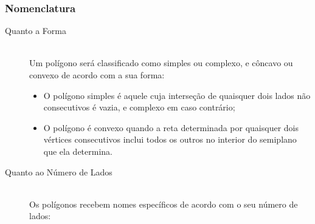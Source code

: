     \subsubsection{Nomenclatura}
        \begin{description}
            \item[Quanto a Forma] \hfill \\
                Um polígono será classificado como simples ou complexo, e côncavo ou convexo de acordo com a sua forma:
                \begin{itemize}
                    \item O polígono simples é aquele cuja interseção de quaisquer dois lados não consecutivos é vazia, e complexo em caso contrário;
                    \item O polígono é convexo quando a reta determinada por quaisquer dois vértices consecutivos inclui todos os outros no interior do semiplano que ela determina.
                \end{itemize} 
            \item[Quanto ao Número de Lados] \hfill \\
                Os polígonos recebem nomes específicos de acordo com o seu número de lados:
                \begin{enumerate}[start=3]
\end{enumerate}
\end{description}
